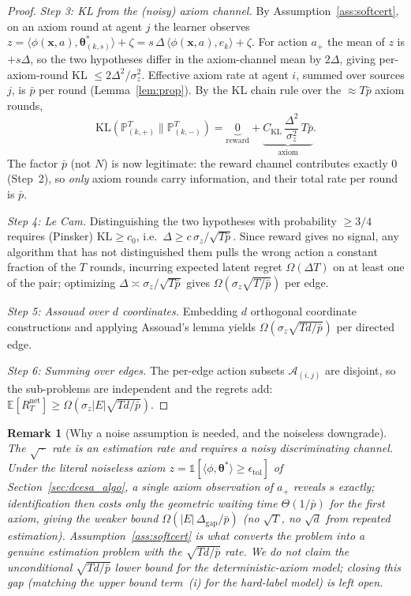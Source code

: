 \documentclass[11pt]{article}
\newtheorem*{remark}{Remark}
\begin{document}
\begin{proof}
\textit{Step 3: KL from the (noisy) axiom channel.}
By Assumption~\ref{ass:softcert}, on an axiom round at agent $j$ the
learner observes $z=\langle\phi(\bm{x},a),\bm{\theta}^{\!*}_{(k,s)}\rangle+\zeta
=s\,\Delta\,\langle\phi(\bm{x},a),e_k\rangle+\zeta$.  For action $a_+$
the mean of $z$ is $+s\Delta$, so the two hypotheses differ in the
axiom-channel mean by $2\Delta$, giving per-axiom-round KL
$\leq 2\Delta^2/\sigma_z^2$.  Effective axiom rate at agent $i$,
summed over sources $j$, is $\bar p$ per round
(Lemma~\ref{lem:prop}).  By the KL chain rule over the $\approx T\bar p$
axiom rounds,
\[
\mathrm{KL}(\mathbb{P}_{(k,+)}^T\|\mathbb{P}_{(k,-)}^T)
=\underbrace{0}_{\text{reward}}+\underbrace{C_{\mathrm{KL}}\,\frac{\Delta^2}{\sigma_z^2}\,T\bar p}_{\text{axiom}}.
\]
The factor $\bar p$ (not $N$) is now legitimate: the reward channel
contributes exactly $0$ (Step~2), so \emph{only} axiom rounds carry
information, and their total rate per round is $\bar p$.

\textit{Step 4: Le Cam.}  Distinguishing the two hypotheses with
probability $\geq 3/4$ requires (Pinsker) $\mathrm{KL}\geq c_0$, i.e.\
$\Delta\geq c\,\sigma_z/\sqrt{T\bar p}$.  Since reward gives no signal,
any algorithm that has not distinguished them pulls the wrong action a
constant fraction of the $T$ rounds, incurring expected latent regret
$\Omega(\Delta T)$ on at least one of the pair; optimizing
$\Delta\asymp\sigma_z/\sqrt{T\bar p}$ gives $\Omega(\sigma_z\sqrt{T/\bar p})$
per edge.

\textit{Step 5: Assouad over $d$ coordinates.}
Embedding $d$ orthogonal coordinate constructions and applying
Assouad's lemma yields $\Omega(\sigma_z\sqrt{Td/\bar p})$ per directed
edge.

\textit{Step 6: Summing over edges.}
The per-edge action subsets $\mathcal{A}_{(i,j)}$ are disjoint, so the
sub-problems are independent and the regrets add:
$\mathbb{E}[R_T^{\mathrm{net}}]\geq\Omega(\sigma_z|E|\sqrt{Td/\bar p})$.
\qedhere
\end{proof}

\begin{remark}[Why a noise assumption is needed, and the noiseless
downgrade]\label{rem:epi_downgrade}
The $\sqrt{\,\cdot\,}$ rate is an estimation rate and \emph{requires} a
noisy discriminating channel.  Under the literal noiseless axiom
$z=\mathbb{1}[\langle\phi,\bm{\theta}^{\!*}\rangle\geq\epsilon_{\mathrm{tol}}]$
of Section~\ref{sec:dcesa_algo}, a single axiom observation of $a_+$
reveals $s$ \emph{exactly}; identification then costs only the
geometric waiting time $\Theta(1/\bar p)$ for the first axiom, giving
the weaker bound $\Omega(|E|\,\Delta_{\mathrm{gap}}/\bar p)$ (no
$\sqrt{T}$, no $\sqrt d$ from repeated estimation).
Assumption~\ref{ass:softcert} is what converts the problem into a
genuine estimation problem with the $\sqrt{Td/\bar p}$ rate.  We do not
claim the unconditional $\sqrt{Td/\bar p}$ lower bound for the
deterministic-axiom model; closing this gap (matching the
upper bound term~(i) for the hard-label model) is left \emph{open}.
\end{remark}
\end{document}
